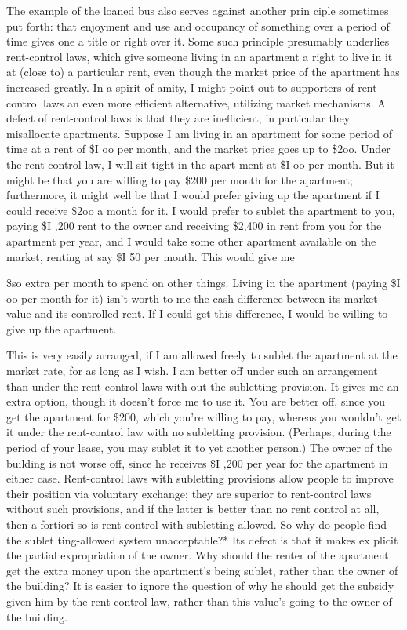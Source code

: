 \documentclass[11pt,openany]{book}
\begin{document}
The example of the loaned bus also serves against another prin ciple sometimes put forth: that enjoyment and use and occupancy of something over a period of time gives one a title or right over it. Some such principle presumably underlies rent-control laws, which give someone living in an apartment a right to live in it at (close to) a particular rent, even though the market price of the apartment has increased greatly. In a spirit of amity, I might point out to supporters of rent-control laws an even more efficient alternative, utilizing market mechanisms. A defect of rent-control laws is that they are inefficient; in particular they misallocate apartments. Suppose I am living in an apartment for some period of time at a rent of \$I oo per month, and the market price goes up to \$2oo. Under the rent-control law, I will sit tight in the apart ment at \$I oo per month. But it might be that you are willing to pay \$200 per month for the apartment; furthermore, it might well be that I would prefer giving up the apartment if I could receive \$2oo a month for it. I would prefer to sublet the apartment to you, paying \$I ,200 rent to the owner and receiving \$2,400 in rent from you for the apartment per year, and I would take some other apartment available on the market, renting at say \$I 50 per month. This would give me 

\$so extra per month to spend on other things. Living in the apartment (paying \$I oo per month for it) isn't worth to me the cash difference between its market value and its controlled rent. If I could get this difference, I would be willing to give up the apartment. 

This is very easily arranged, if I am allowed freely to sublet the apartment at the market rate, for as long as I wish. I am better off under such an arrangement than under the rent-control laws with out the subletting provision. It gives me an extra option, though it doesn't force me to use it. You are better off, since you get the apartment for \$200, which you're willing to pay, whereas you wouldn't get it under the rent-control law with no subletting provision. (Perhaps, during t:he period of your lease, you may sublet it to yet another person.) The owner of the building is not worse off, since he receives \$I ,200 per year for the apartment in either case. Rent-control laws with subletting provisions allow people to improve their position via voluntary exchange; they are superior to rent-control laws without such provisions, and if the latter is better than no rent control at all, then a fortiori so is rent control with subletting allowed. So why do people find the sublet ting-allowed system unacceptable?* Its defect is that it makes ex plicit the partial expropriation of the owner. Why should the renter of the apartment get the extra money upon the apartment's being sublet, rather than the owner of the building? It is easier to ignore the question of why he should get the subsidy given him by the rent-control law, rather than this value's going to the owner of the building. 
\end{document}
